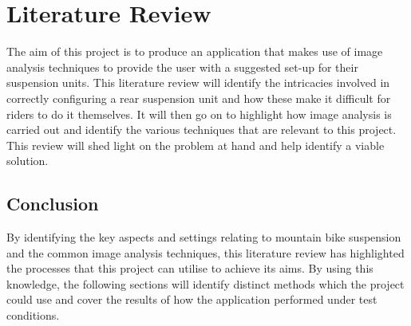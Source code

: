 \section{Literature Review}\label{sec:lit_review}
	The aim of this project is to produce an application that makes use of image analysis techniques to provide the user with a suggested set-up for their suspension units. This literature review will identify the intricacies involved in correctly configuring a rear suspension unit and how these make it difficult for riders to do it themselves. It will then go on to highlight how image analysis is carried out and identify the various techniques that are relevant to this project. This review will shed light on the problem at hand and help identify a viable solution.
	
	
	
	
	
	
	\subsection{Conclusion}
		By identifying the key aspects and settings relating to mountain bike suspension and the common image analysis techniques, this literature review has highlighted the processes that this project can utilise to achieve its aims. By using this knowledge, the following sections will identify distinct methods which the project could use and cover the results of how the application performed under test conditions.